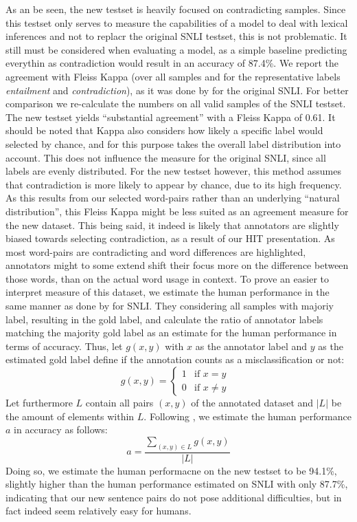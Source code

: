 As an be seen, the new testset is heavily focused on contradicting samples. Since this testset only serves to measure the capabilities of a model to deal with lexical inferences and not  to replacr the original \ac{SNLI} testset, this is not problematic. It still must be considered when evaluating a model, as a simple baseline predicting everythin as contradiction would result in an accuracy of 87.4\%. We report the agreement with Fleiss Kappa \citep{landis1977measurement} (over all samples and for the representative labels \textit{entailment} and \textit{contradiction}), as it was done by \cite{bowman2015large} for the original \ac{SNLI}. For better comparison we re-calculate the numbers on all valid samples of the \ac{SNLI} testset. The new testset yields ``substantial agreement'' with a Fleiss Kappa of 0.61. It should be noted that Kappa also considers how likely a specific label would selected by chance, and for this purpose takes the overall label distribution into account. This does not influence the measure for the original \ac{SNLI}, since all labels are evenly distributed. For the new testset however, this method assumes that contradiction is more likely to appear by chance, due to its high frequency. As this results from our selected word-pairs rather than an underlying ``natural distribution'', this Fleiss Kappa might be less suited as an agreement measure for the new dataset. This being said, it indeed is likely that annotators are slightly biased towards selecting contradiction, as a result of our \ac{HIT} presentation. As most word-pairs are contradicting and word differences are highlighted, annotators might to some extend shift their focus more on the difference between those words, than on the actual word usage in context. To prove an easier to interpret measure of this dataset, we estimate the human performance in the same manner as done by \cite{gong2017natural} for \ac{SNLI}. They considering all samples with majoriy label, resulting in the gold label, and calculate the ratio of annotator labels matching the majority gold label as an estimate for the human performance in terms of accuracy. Thus, let $g(x,y)$ with $x$ as the annotator label and $y$ as the estimated gold label define if the annotation counts as a misclassification or not:
\begin{equation}
g(x,y) = \begin{cases}
1 & \text{if $x = y$} \\
0 & \text{if $x \neq y$ }
\end{cases}
\end{equation}
Let furthermore $L$ contain all pairs $(x,y)$ of the annotated dataset and $|L|$ be the amount of elements within $L$. Following \cite{gong2017natural}, we estimate the human performance $a$ in accuracy as follows:
\begin{equation}
a = \frac{\sum_{(x,y) \in L} g(x,y)}{|L|}
\end{equation}
Doing so, we estimate the human performacne on the new testset to be 94.1\%, slightly higher than the human performance estimated on \ac{SNLI} with only 87.7\%, indicating that our new sentence pairs do not pose additional difficulties, but in fact indeed seem relatively easy for humans.
